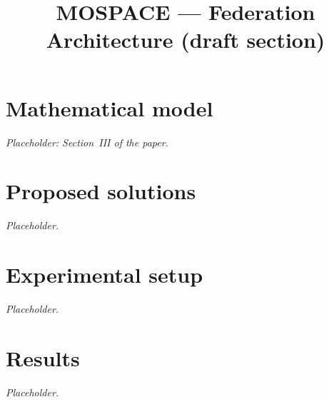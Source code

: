 \documentclass[conference]{IEEEtran}
\begin{document}
\title{MOSPACE --- Federation Architecture (draft section)}
\author{}
\maketitle

\setcounter{section}{2}


\section{Mathematical model}\label{sec:model}
\emph{Placeholder: Section~III of the paper.}
\section{Proposed solutions}\label{sec:solutions}
\emph{Placeholder.}
\section{Experimental setup}\label{sec:experimental_setup}
\emph{Placeholder.}
\section{Results}\label{sec:results}
\emph{Placeholder.}


\end{document}
